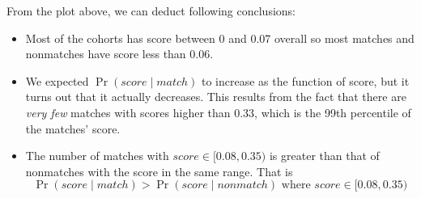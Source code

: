 From the plot above, we can deduct following conclusions:
\begin{itemize}
\item Most of the cohorts has score between 0 and 0.07 overall so most matches and nonmatches have score less than 0.06.
\item We expected $\Pr{(score \mid match)}$ to increase as the function of score, but it turns out that it actually decreases. This results from the fact that there are \emph{very few} matches with scores higher than 0.33, which is the 99th percentile of the matches' score.
\item The number of matches with $score \in [0.08, 0.35)$ is greater than that of nonmatches with the score in the same range. That is 
$$\Pr{(score \mid match)} > \Pr{(score \mid nonmatch)} \mbox{ where } score\in [0.08, 0.35)$$
\end{itemize}

